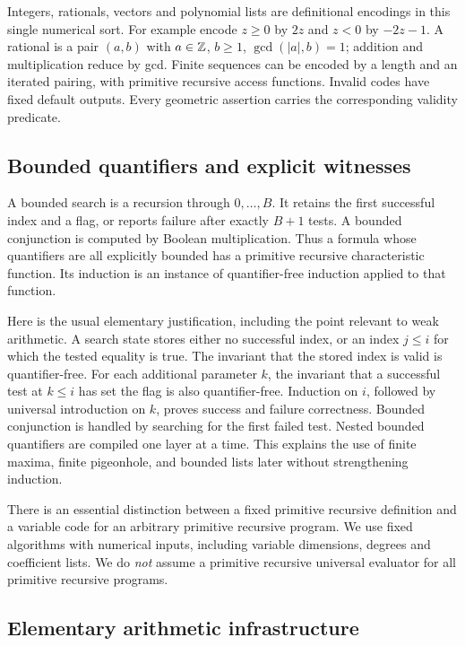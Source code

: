 Integers, rationals, vectors and polynomial lists are definitional encodings
in this single numerical sort. For example encode $z\ge0$ by $2z$ and
$z<0$ by $-2z-1$. A rational is a pair $(a,b)$ with $a\in\mathbb Z$, $b\ge1$,
$\gcd(|a|,b)=1$; addition and multiplication reduce by gcd. Finite sequences
can be encoded by a length and an iterated pairing, with primitive recursive
access functions. Invalid codes have fixed default outputs. Every geometric
assertion carries the corresponding validity predicate.

\subsection{Bounded quantifiers and explicit witnesses}

A bounded search is a recursion through $0,\ldots,B$. It retains the first
successful index and a flag, or reports failure after exactly $B+1$ tests.
A bounded conjunction is computed by Boolean multiplication. Thus a formula
whose quantifiers are all explicitly bounded has a primitive recursive
characteristic function. Its induction is an instance of quantifier-free
induction applied to that function.

Here is the usual elementary justification, including the point relevant to
weak arithmetic. A search state stores either no successful index, or an
index $j\le i$ for which the tested equality is true. The invariant that the
stored index is valid is quantifier-free. For each additional parameter $k$,
the invariant that a successful test at $k\le i$ has set the flag is also
quantifier-free. Induction on $i$, followed by universal introduction on $k$,
proves success and failure correctness. Bounded conjunction is handled by
searching for the first failed test. Nested bounded quantifiers are compiled
one layer at a time. This explains the use of finite maxima, finite
pigeonhole, and bounded lists later without strengthening induction.

There is an essential distinction between a fixed primitive recursive
definition and a variable code for an arbitrary primitive recursive program.
We use fixed algorithms with numerical inputs, including variable dimensions,
degrees and coefficient lists. We do \emph{not} assume a primitive recursive
universal evaluator for all primitive recursive programs.

\subsection{Elementary arithmetic infrastructure}

